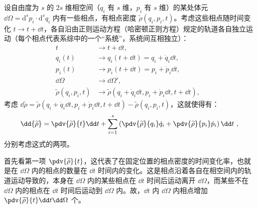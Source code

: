 设自由度为 $s$ 的 $2s$ 维相空间（$q_i$ 有 $s$ 维，$p_i$ 有 $s$ 维）的某处体元 $\dd \Omega = \mathrm{d}^{s}{p_i} \cdot  \mathrm{d}^{s}{q_i}$ 内有一些相点，有相点密度 $\widetilde \rho(q_i, p_i, t)$。考虑这些相点随时间变化 $t \rightarrow t + \dd t$，各自沿由正则运动方程（哈密顿正则方程）规定的轨道各自独立运动（每个相点代表系综中的一个“系统”，系统间互相独立）：
$$
\begin{aligned}
t                            &\rightarrow t+\dd t, \\
q_i(t)                       &\rightarrow q_i(t+\dd t) = q_i + \dot q_i \dd t, \\
p_i(t)                       &\rightarrow p_i(t+\dd t) = p_i + \dot p_i \dd t, \\
\dd \Omega                   &\rightarrow \dd \Omega', \\
\widetilde \rho(q_i, p_i, t) &\rightarrow \widetilde \rho(q_i + \dot q_i \dd t, p_i + \dot p_i \dd t, t + \dd t),
\end{aligned}~~
$$
考虑 $\dd{\widetilde{\rho}} = \widetilde{\rho}(q_i + \dot q_i \dd t, p_i + \dot p_i \dd t, t + \dd t) - \widetilde{\rho}(q_i, p_i, t)$，这就使得有：
\begin{equation}
\dd{\widetilde \rho} = \pdv{\widetilde \rho}{t} \dd t + \sum_{i=1}^{s}\left(\pdv{\widetilde \rho}{q_i}\dot q_i + \pdv{\widetilde \rho}{p_i}\dot p_i\right) \dd t  ~,
\end{equation}
分别考虑这式的两项。

首先看第一项 $\pdv{\widetilde \rho}{t}$，这代表了在固定位置的相点密度的时间变化率，也就是在 $\dd \Omega$ 内的相点的数量在 $\dd t$ 时间内的变化。这是相点沿着各自在相空间内的轨道运动导致的，本身在 $\dd \Omega$ 内的某些相点在 $\dd t$ 时间后运动离开 $\dd \Omega$，而某些不在 $\dd \Omega$ 内的相点在 $\dd t$ 时间后运动到 $\dd \Omega$ 内。故，$\dd t$ 内 $\dd \Omega$ 内相点增加 $\pdv{\widetilde \rho}{t} \dd t \dd \Omega$ 个。

